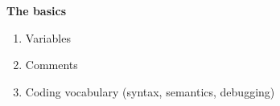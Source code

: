 \begin{toolbox} \textbf{The basics}
\begin{enumerate}
\item Variables
\item Comments
\item Coding vocabulary (syntax, semantics, debugging)
\end{enumerate}
\end{toolbox}



%
%
%
%
%
%
%
%
%
%
